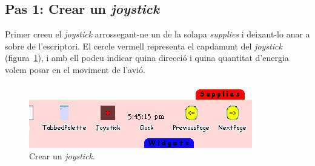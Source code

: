 \subsection{Pas 1: Crear un \emph{joystick}}
Primer creeu el \emph{joystick} arrossegant-ne un de la solapa \emph{supplies} i deixant-lo anar a sobre de l'escriptori. El cercle vermell representa el capdamunt del \emph{joystick} (figura~\ref{fig2415}), i amb ell podeu indicar quina direcció i quina quantitat d'energia volem posar en el moviment de l'avió.
\begin{figure}[h!]
\begin{center}
\includegraphics[scale=0.75]{Imatges/figura24-15}
\end{center}
\caption{Crear un \emph{joystick}.}
\label{fig2415}
\end{figure}

